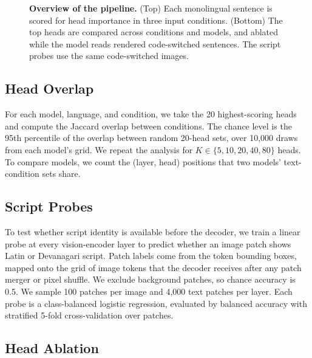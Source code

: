 \documentclass[10pt]{article}
\begin{document}
\begin{figure}[t]
\caption{\textbf{Overview of the pipeline.} (Top) Each monolingual sentence is scored for head importance in three input conditions. (Bottom) The top heads are compared across conditions and models, and ablated while the model reads rendered code-switched sentences. The script probes use the same code-switched images.}
\label{fig:pipeline}
\end{figure}

\subsection{Head Overlap}
\label{sec:overlap_method}

For each model, language, and condition, we take the 20 highest-scoring heads and compute the Jaccard overlap between conditions. The chance level is the 95th percentile of the overlap between random 20-head sets, over 10{,}000 draws from each model's grid. We repeat the analysis for $K \in \{5, 10, 20, 40, 80\}$ heads. To compare models, we count the (layer, head) positions that two models' text-condition sets share.

\subsection{Script Probes}
\label{sec:probe_method}

To test whether script identity is available before the decoder, we train a linear probe at every vision-encoder layer to predict whether an image patch shows Latin or Devanagari script. Patch labels come from the token bounding boxes, mapped onto the grid of image tokens that the decoder receives after any patch merger or pixel shuffle. We exclude background patches, so chance accuracy is 0.5. We sample 100 patches per image and 4,000 text patches per layer. Each probe is a class-balanced logistic regression, evaluated by balanced accuracy with stratified 5-fold cross-validation over patches.

\subsection{Head Ablation}
\label{sec:ablation_method}
\end{document}
